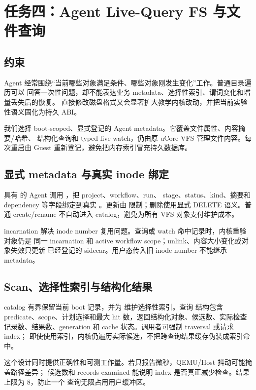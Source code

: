 \chapter{任务四：Agent Live-Query FS 与文件查询}
\label{chap:task4}

\section{约束}

Agent 经常围绕“当前哪些对象满足条件、哪些对象刚发生变化”工作。普通目录遍历可以
回答一次性问题，却不能表达业务 metadata、选择性索引、谓词变化和增量丢失后的恢复。
直接修改磁盘格式又会显著扩大教学内核改动，并把当前实验性语义固化为持久 ABI。

我们选择 boot-scoped、显式登记的 Agent metadata。它覆盖文件属性、内容摘要/哈希、
结构化查询和 typed live watch，仍由原 uCore VFS 管理文件内容。每次重启由 Guest
重新登记，避免把内存索引冒充持久数据库。

\section{显式 metadata 与真实 inode 绑定}

具有  的 Agent 调用 ，把 project、workflow、run、
stage、status、kind、摘要和 dependency 等字段绑定到真实
。更新由  限制；删除使用显式 DELETE
语义。普通 create/rename 不自动进入 catalog，避免为所有 VFS 对象支付维护成本。

incarnation 解决 inode number 复用问题。查询或 watch 命中记录时，内核重验对象仍是
同一 incarnation 和 active workflow scope；unlink、内容大小变化或对象失效只更新
已经登记的 sidecar。用户态传入旧 inode number 不能继承 metadata。

\section{Scan、选择性索引与结构化结果}

catalog 有界保留当前 boot 记录，并为  维护选择性索引。查询
结构包含 predicate、scope、计划选择和最大 hit 数，返回结构化对象、候选数、实际检查
记录数、结果数、generation 和 cache 状态。调用者可强制 traversal 或请求 index；
即使使用索引，内核仍遍历实际候选，不把跨查询结果缓存伪装成索引命中。

这个设计同时提供正确性和可测工作量。若只报告微秒，QEMU/Host 抖动可能掩盖路径差异；
候选数和 records examined 能说明 index 是否真正减少检查。结果上限为 8，防止一个
查询无限占用用户缓冲区。

